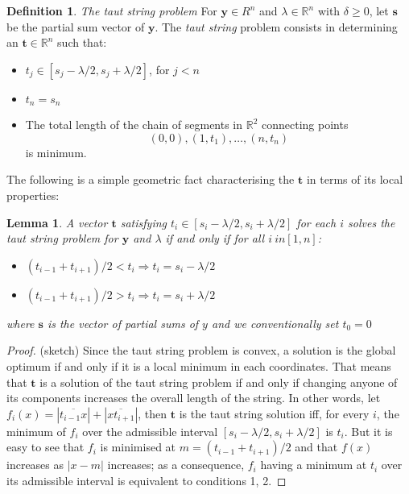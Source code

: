 \documentclass{article}
\newtheorem{lemma}[theorem]{Lemma}
\theoremstyle{definition}
\newtheorem{definition}{Definition}[section]
\def\*#1{\mathbf{#1}}
\def\R{\mathbb{R}}
\begin{document}
\begin{definition}{\em The taut string problem}
  For $\*y \in R^n$ and $\lambda \in \R^n$ with $\delta \geq 0$, let $\*s$ be the partial sum vector of $\*y$. The {\em taut string}
  problem consists in determining an $\*t \in \R^n$ such that:
  \begin{itemize}
    \item $t_j \in [s_j - \lambda/2, s_j + \lambda / 2]$, for $j < n$
    \item $t_n = s_n$
    \item The total length of the chain of segments in $\R^2$ connecting points \[(0, 0), (1, t_1), \dots, (n, t_n)\] is minimum.
  \end{itemize}
\end{definition}

The following is a simple geometric fact characterising the $\*t$ in terms of its local properties:

\begin{lemma}\label{variation}
  A vector $\*t$ satisfying $t_i \in [s_i - \lambda/2, s_i + \lambda/2]$ for each $i$ solves the taut string problem for $\*y$ and $\lambda$ if and only if for all $i \ in [1, n]$:
  \begin{itemize}
    \item $(t_{i-1} + t_{i + 1}) / 2 < t_i \Rightarrow t_i = s_i - \lambda/2$
    \item $(t_{i-1} + t_{i + 1}) / 2 > t_i \Rightarrow t_i = s_i + \lambda/2$
  \end{itemize}
  where $\*s$ is the vector of partial sums of $y$ and we conventionally set $t_0 = 0$
\end{lemma}
\begin{proof} (sketch)
  Since the taut string problem is convex, a solution is the global optimum if and only if it is a local minimum in each coordinates.
  That means that $\*t$ is a solution of the taut string problem if and only if changing anyone of its components increases the
  overall length of the string. In other words, let $f_i(x) = |\overline{t_{i-1}x}| + |\overline{xt_{i+1}}|$, then $\*t$ is the taut string solution
  iff, for every $i$, the minimum of $f_i$ over the admissible interval $[s_i - \lambda/2, s_i + \lambda/2]$ is $t_i$.
  But it is easy to see that $f_i$ is minimised at $m = (t_{i-1} + t_{i+1})/2$ and that $f(x)$ increases as $|x - m|$ increases; as a consequence, $f_i$ having a minimum at $t_i$ over its admissible interval is equivalent to conditions 1, 2.
\end{proof}
\end{document}
